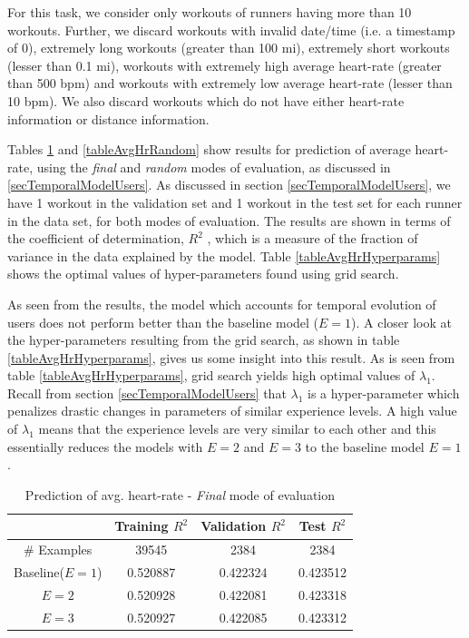\documentclass{acm_proc_article-sp}
\begin{document}
For this task, we consider only workouts of runners having more than 10 workouts. Further, we discard workouts with invalid date/time (i.e. a timestamp of 0), extremely long workouts (greater than 100 mi), extremely short workouts (lesser than 0.1 mi), workouts with extremely high average heart-rate (greater than 500 bpm) and workouts with extremely low average heart-rate (lesser than 10 bpm). We also discard workouts which do not have either heart-rate information or distance information.

Tables \ref{tableAvgHrFinal} and \ref{tableAvgHrRandom} show results for prediction of average heart-rate, using the  \emph{final} and \emph{random} modes of evaluation, as discussed in \ref{secTemporalModelUsers}. As discussed in section \ref{secTemporalModelUsers}, we have 1 workout in the validation set and 1 workout in the test set for each runner in the data set, for both modes of evaluation. The results are shown in terms of the coefficient of determination, $R^2$ \cite{r2Wiki}, which is a measure of the fraction of variance in the data explained by the model. Table \ref{tableAvgHrHyperparams} shows the optimal values of hyper-parameters found using grid search.

As seen from the results, the model which accounts for temporal evolution of users does not perform better than the baseline model ($E = 1$). A closer look at the hyper-parameters resulting from the grid search, as shown in table \ref{tableAvgHrHyperparams}, gives us some insight into this result. As is seen from table \ref{tableAvgHrHyperparams}, grid search yields high optimal values of $\lambda_1$. Recall from section \ref{secTemporalModelUsers} that $\lambda_1$ is a hyper-parameter which penalizes drastic changes in parameters of similar experience levels. A high value of $\lambda_1$ means that the experience levels are very similar to each other and this essentially reduces the models with $E = 2$ and $E = 3$ to the baseline model $E = 1$.

\begin{table}[h]
\centering
\begin{tabular}{|c|c|c|c|} \hline
& Training $R^2$ & Validation $R^2$ & Test $R^2$ \\ \hline
\# Examples & 39545 & 2384 & 2384  \\ \hline
Baseline($E = 1$)& 0.520887 & 0.422324 & 0.423512 \\ \hline
$E = 2$ & 0.520928 & 0.422081 & 0.423318 \\ \hline
$E = 3$ & 0.520927 & 0.422085 & 0.423312 \\ \hline
\end{tabular}
\caption{Prediction of avg. heart-rate - \emph{Final} mode of evaluation }
\label{tableAvgHrFinal}
\end{table}
\end{document}
